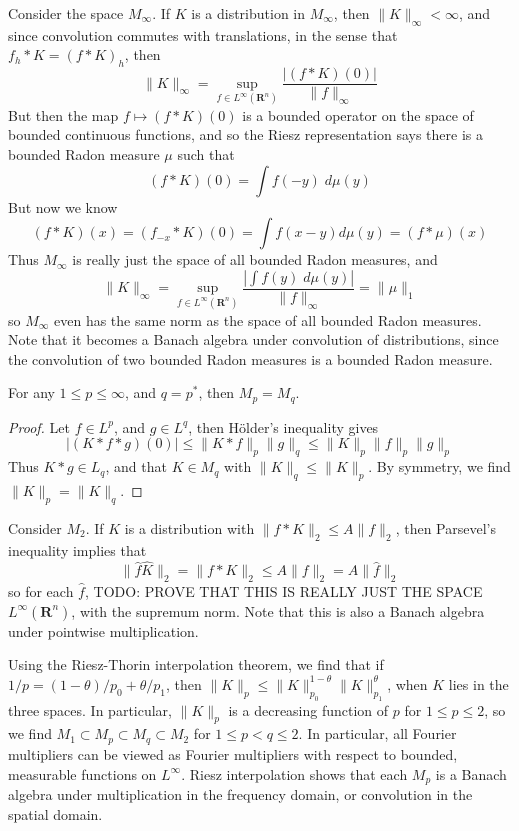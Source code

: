 \begin{example}
	Consider the space $M_\infty$. If $K$ is a distribution in $M_\infty$, then $\| K \|_\infty < \infty$, and since convolution commutes with translations, in the sense that $f_h * K = (f * K)_h$, then
	\[ \| K \|_\infty = \sup_{f \in L^\infty(\mathbf{R}^n)} \frac{|(f * K)(0)|}{\| f \|_\infty} \]
	But then the map $f \mapsto (f * K)(0)$ is a bounded operator on the space of bounded continuous functions, and so the Riesz representation says there is a bounded Radon measure $\mu$ such that
	\[ (f * K)(0) = \int f(-y)\; d\mu(y) \]
	But now we know
	\[ (f * K)(x) = (f_{-x} * K)(0) = \int f(x - y) d\mu(y) = (f * \mu)(x) \]
	Thus $M_\infty$ is really just the space of all bounded Radon measures, and
	\[ \| K \|_\infty = \sup_{f \in L^\infty(\mathbf{R}^n)} \frac{\left| \int f(y)\; d\mu(y) \right|}{\| f \|_\infty} = \| \mu \|_1 \]
	so $M_\infty$ even has the same norm as the space of all bounded Radon measures. Note that it becomes a Banach algebra under convolution of distributions, since the convolution of two bounded Radon measures is a bounded Radon measure.
\end{example}

\begin{theorem}
	For any $1 \leq p \leq \infty$, and $q = p^*$, then $M_p = M_q$.
\end{theorem}
\begin{proof}
	Let $f \in L^p$, and $g \in L^q$, then H\"{o}lder's inequality gives
	\[ |(K * f * g)(0)| \leq \| K * f \|_p \| g \|_q \leq \| K \|_p \| f \|_p \| g \|_p \]
	Thus $K * g \in L_q$, and that $K \in M_q$ with $\| K \|_q \leq \| K \|_p$. By symmetry, we find $\| K \|_p = \| K \|_q$.
\end{proof}

\begin{example}
	Consider $M_2$. If $K$ is a distribution with $\| f * K \|_2 \leq A \| f \|_2$, then Parsevel's inequality implies that
	\[ \| \widehat{f} \widehat{K} \|_2 = \| f * K \|_2 \leq A \| f \|_2 = A \| \widehat{f} \|_2 \]
	so for each $\widehat{f}$, TODO: PROVE THAT THIS IS REALLY JUST THE SPACE $L^\infty(\mathbf{R}^n)$, with the supremum norm. Note that this is also a Banach algebra under pointwise multiplication.
\end{example}

Using the Riesz-Thorin interpolation theorem, we find that if $1/p = (1 - \theta)/p_0 + \theta/p_1$, then $\| K \|_p \leq \| K \|_{p_0}^{1 - \theta} \| K \|_{p_1}^\theta$, when $K$ lies in the three spaces. In particular, $\| K \|_p$ is a decreasing function of $p$ for $1 \leq p \leq 2$, so we find $M_1 \subset M_p \subset M_q \subset M_2$ for $1 \leq p < q \leq 2$. In particular, all Fourier multipliers can be viewed as Fourier multipliers with respect to bounded, measurable functions on $L^\infty$. Riesz interpolation shows that each $M_p$ is a Banach algebra under multiplication in the frequency domain, or convolution in the spatial domain.

